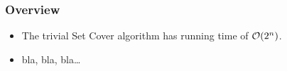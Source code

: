 \begin{frame}\frametitle{Overview}
\begin{itemize}
\pause \item The trivial Set Cover algorithm has running time of ${\cal O}(2^n)$.
\pause \item bla, bla, bla\ldots
\end{itemize}

\end{frame}
